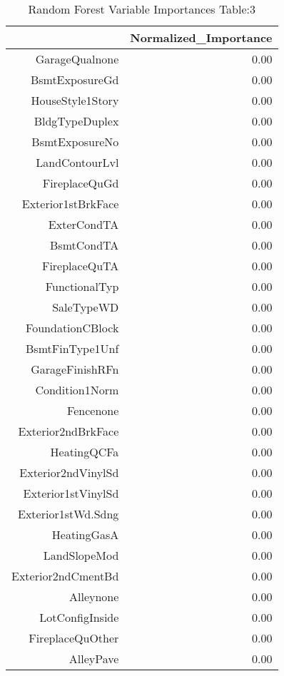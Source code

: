 \begin{table}[ht]
\centering
\begin{tabular}{rr}
  \hline
 & Normalized\_Importance \\ 
  \hline
GarageQualnone & 0.00 \\ 
  BsmtExposureGd & 0.00 \\ 
  HouseStyle1Story & 0.00 \\ 
  BldgTypeDuplex & 0.00 \\ 
  BsmtExposureNo & 0.00 \\ 
  LandContourLvl & 0.00 \\ 
  FireplaceQuGd & 0.00 \\ 
  Exterior1stBrkFace & 0.00 \\ 
  ExterCondTA & 0.00 \\ 
  BsmtCondTA & 0.00 \\ 
  FireplaceQuTA & 0.00 \\ 
  FunctionalTyp & 0.00 \\ 
  SaleTypeWD & 0.00 \\ 
  FoundationCBlock & 0.00 \\ 
  BsmtFinType1Unf & 0.00 \\ 
  GarageFinishRFn & 0.00 \\ 
  Condition1Norm & 0.00 \\ 
  Fencenone & 0.00 \\ 
  Exterior2ndBrkFace & 0.00 \\ 
  HeatingQCFa & 0.00 \\ 
  Exterior2ndVinylSd & 0.00 \\ 
  Exterior1stVinylSd & 0.00 \\ 
  Exterior1stWd.Sdng & 0.00 \\ 
  HeatingGasA & 0.00 \\ 
  LandSlopeMod & 0.00 \\ 
  Exterior2ndCmentBd & 0.00 \\ 
  Alleynone & 0.00 \\ 
  LotConfigInside & 0.00 \\ 
  FireplaceQuOther & 0.00 \\ 
  AlleyPave & 0.00 \\ 
   \hline
\end{tabular}
\caption{Random Forest Variable Importances Table:3} 
\label{tab:importance3}
\end{table}

